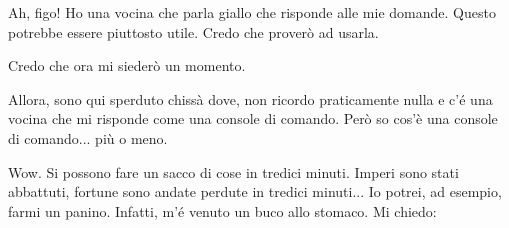 Ah, figo! Ho una vocina che parla giallo che risponde alle mie domande. Questo
potrebbe essere piuttosto utile. Credo che proverò ad usarla.

\begin{center}
\colorbox{gray}{\begin{minipage}[t]{1.1\textwidth}






















\end{minipage}}
\end{center}

Credo che ora mi siederò un momento.

Allora, sono qui sperduto chissà dove, non ricordo praticamente nulla e c'é una
vocina che mi risponde come una console di comando. Però so cos'è una console di
comando... più o meno.




Wow. Si possono fare un sacco di cose in tredici minuti. Imperi sono stati
abbattuti, fortune sono andate perdute in tredici minuti... Io potrei, ad
esempio, farmi un panino. Infatti, m'é venuto un buco allo stomaco. Mi chiedo:

